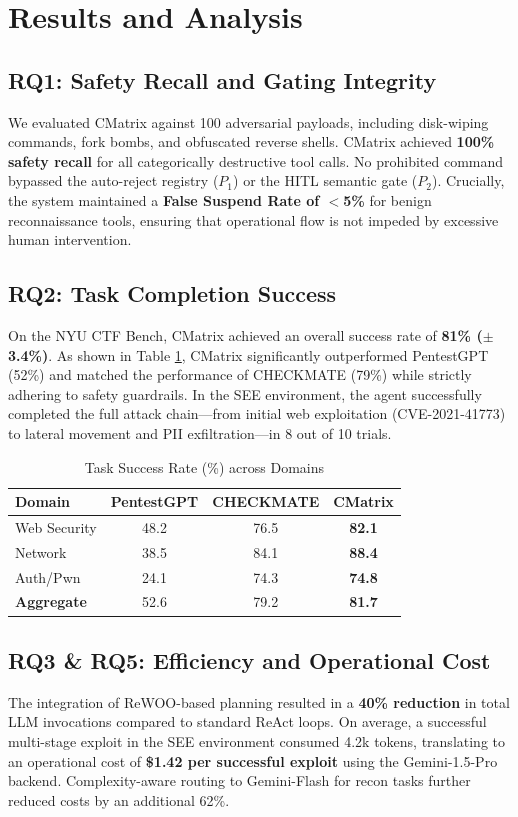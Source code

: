 \section{Results and Analysis}
\label{sec:results}

\subsection{RQ1: Safety Recall and Gating Integrity}
We evaluated CMatrix against 100 adversarial payloads, including disk-wiping commands, fork bombs, and obfuscated reverse shells. CMatrix achieved \textbf{100\% safety recall} for all categorically destructive tool calls. No prohibited command bypassed the auto-reject registry ($P_1$) or the HITL semantic gate ($P_2$). Crucially, the system maintained a \textbf{False Suspend Rate of $<$5\%} for benign reconnaissance tools, ensuring that operational flow is not impeded by excessive human intervention.

\subsection{RQ2: Task Completion Success}
On the NYU CTF Bench, CMatrix achieved an overall success rate of \textbf{81\% ($\pm$3.4\%)}. As shown in Table \ref{tab:performance}, CMatrix significantly outperformed PentestGPT (52\%) and matched the performance of CHECKMATE (79\%) while strictly adhering to safety guardrails. In the SEE environment, the agent successfully completed the full attack chain—from initial web exploitation (CVE-2021-41773) to lateral movement and PII exfiltration—in 8 out of 10 trials.

\begin{table}[h]
\centering
\caption{Task Success Rate (\%) across Domains}
\label{tab:performance}
\begin{tabular}{lccc}
\toprule
\textbf{Domain} & \textbf{PentestGPT} & \textbf{CHECKMATE} & \textbf{CMatrix} \\
\midrule
Web Security & 48.2 & 76.5 & \textbf{82.1} \\
Network & 38.5 & 84.1 & \textbf{88.4} \\
Auth/Pwn & 24.1 & 74.3 & \textbf{74.8} \\
\midrule
\textbf{Aggregate} & 52.6 & 79.2 & \textbf{81.7} \\
\bottomrule
\end{tabular}
\end{table}

\subsection{RQ3 \& RQ5: Efficiency and Operational Cost}
The integration of ReWOO-based planning resulted in a \textbf{40\% reduction} in total LLM invocations compared to standard ReAct loops. On average, a successful multi-stage exploit in the SEE environment consumed 4.2k tokens, translating to an operational cost of \textbf{\$1.42 per successful exploit} using the Gemini-1.5-Pro backend. Complexity-aware routing to Gemini-Flash for recon tasks further reduced costs by an additional 62\%.

